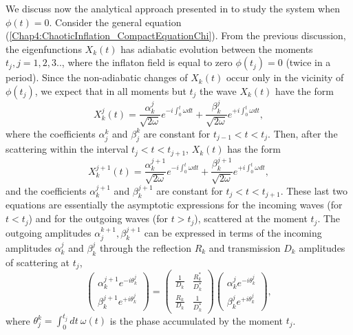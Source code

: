 \documentclass[11pt,a4paper,twoside]{book}
\begin{document}
We discuss now the analytical approach presented in \cite{Chap4:LindePreheatingModel} to study the system when $ \phi(t)=0 $. Consider the general equation (\ref{Chap4:ChaoticInflation_CompactEquationChi}). From the previous discussion, the eigenfunctions $ X_{k}(t) $ has adiabatic evolution between the moments $ t_{j}, j=1,2,3.. $, where the inflaton field is equal to zero $ \phi(t_{j})=0 $ (twice in a period). Since the non-adiabatic changes of $ X_{k}(t) $ occur only in the vicinity of $\phi(t_{j})$, we expect that in all moments but $ t_{j} $ the wave $ X_{k}(t) $ have the form 
\begin{equation}
	\label{Chap4:ParabolicPotential_scatter1}
		X_{k}^{j}(t) = \frac{\alpha^{j}_{k}}{\sqrt{2\omega}}e^{-i\int^{t}_{0} \omega dt} 
	+ \frac{\beta^{j}_{k}}{\sqrt{2\omega}}e^{+i\int^{t}_{0} \omega dt},
\end{equation}
where the coefficients $ \alpha_{j}^{k} $ and $ \beta_{j}^{k} $ are constant for $ t_{j-1} < t < t_{j} $. Then, after the scattering within the interval $ t_{j}<t<t_{j+1} $, $ X_{k}(t) $ has the form
\begin{equation}
\label{Chap4:scattering2}
X_{k}^{j+1}(t) = \frac{\alpha^{j+1}_{k}}{\sqrt{2\omega}}e^{-i\int^{t}_{0} \omega dt} 
+ \frac{\beta^{j+1}_{k}}{\sqrt{2\omega}}e^{+i\int^{t}_{0} \omega dt},
\end{equation}
and the coefficients $ \alpha_{k}^{j+1} $ and $ \beta_{k}^{j+1} $ are constant for $ t_{j}<t<t_{j+1} $. These last two equations are essentially the asymptotic expressions for the incoming waves (for $ t < t_{j} $) and for the outgoing waves (for $ t > t_{j} $), scattered at the moment $ t_{j} $. The outgoing amplitudes $ \alpha_{j}^{k+1}, \beta_{k}^{j+1} $ can be expressed in terms of the incoming amplitudes $ \alpha_{k}^{j} $ and $ \beta_{k}^{j} $ through the reflection $ R_{k} $ and transmission $ D_{k} $ amplitudes  of scattering at $ t_{j} $,
\begin{equation}
	\label{Chap4:ScatteringMatrices}
		\left(
		\begin{array}{c}
			\alpha_{k}^{j+1}e^{-i\theta_{k}^{j}} \\
			\beta_{k}^{j+1}e^{+i\theta_{k}^{j}}
		\end{array}
		\right)
		=
		\left(
		\begin{array}{cc}
			\frac{1}{D_{k}}  & \frac{R_{k}^{*}}{D_{k}^{*}} \\
			\frac{R_{k}}{D_{k}} & \frac{1}{D^{*}_{k}}
		\end{array}
		\right)
		\left(
		\begin{array}{c}
		\alpha_{k}^{j}e^{-i\theta_{k}^{j}}	\\
			\beta_{k}^{j}e^{+i\theta_{k}^{j}}
		\end{array}
		\right),
	\end{equation}
where $ \theta_{j}^{k}=\int_{0}^{t_{j}} dt\ \omega(t)$ is the phase accumulated by the moment $ t_{j} $.
\end{document}
